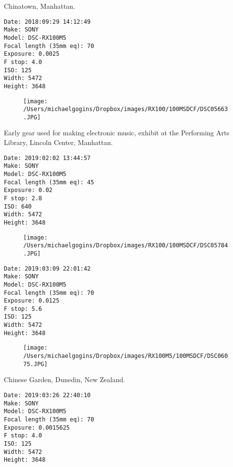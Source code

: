 \documentclass[11pt,letter,DIV=14,paper=landscape]{scrbook}
\begin{document}
\clearpage
\noindent Chinatown, Manhattan.
\noindent
\begin{lstlisting}
Date: 2018:09:29 14:12:49
Make: SONY
Model: DSC-RX100M5
Focal length (35mm eq): 70
Exposure: 0.0025
F stop: 4.0
ISO: 125
Width: 5472
Height: 3648
\end{lstlisting}
\clearpage

\begin{figure}
\texttt{[image: /Users/michaelgogins/Dropbox/images/RX100/100MSDCF/DSC05663.JPG]}
\end{figure}
    
\clearpage
\noindent Early gear used for making electronic music, exhibit at the Performing Arts Library, Lincoln Center, Manhattan.
\noindent
\begin{lstlisting}
Date: 2019:02:02 13:44:57
Make: SONY
Model: DSC-RX100M5
Focal length (35mm eq): 45
Exposure: 0.02
F stop: 2.8
ISO: 640
Width: 5472
Height: 3648
\end{lstlisting}
\clearpage

\begin{figure}
\texttt{[image: /Users/michaelgogins/Dropbox/images/RX100/100MSDCF/DSC05784.JPG]}
\end{figure}
    
\clearpage
\noindent 
\noindent
\begin{lstlisting}
Date: 2019:03:09 22:01:42
Make: SONY
Model: DSC-RX100M5
Focal length (35mm eq): 70
Exposure: 0.0125
F stop: 5.6
ISO: 125
Width: 5472
Height: 3648
\end{lstlisting}
\clearpage

\begin{figure}
\texttt{[image: /Users/michaelgogins/Dropbox/images/RX100M5/100MSDCF/DSC06075.JPG]}
\end{figure}
    
\clearpage
\noindent Chinese Garden, Dunedin, New Zealand.
\noindent
\begin{lstlisting}
Date: 2019:03:26 22:40:10
Make: SONY
Model: DSC-RX100M5
Focal length (35mm eq): 70
Exposure: 0.0015625
F stop: 4.0
ISO: 125
Width: 5472
Height: 3648
\end{lstlisting}
\clearpage
\end{document}
